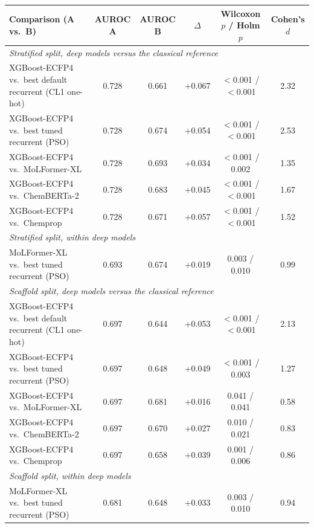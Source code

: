 \begin{tabular}{lccccc}
\toprule
Comparison (A vs.\ B) & AUROC A & AUROC B & $\Delta$ & Wilcoxon $p$ / Holm $p$ & Cohen's $d$ \\
\midrule
\multicolumn{6}{l}{\emph{Stratified split, deep models versus the classical reference}} \\
XGBoost-ECFP4 vs.\ best default recurrent (CL1 one-hot) & 0.728 & 0.661 & +0.067 & $<$0.001 / $<$0.001 & 2.32 \\
XGBoost-ECFP4 vs.\ best tuned recurrent (PSO) & 0.728 & 0.674 & +0.054 & $<$0.001 / $<$0.001 & 2.53 \\
XGBoost-ECFP4 vs.\ MoLFormer-XL & 0.728 & 0.693 & +0.034 & $<$0.001 / 0.002 & 1.35 \\
XGBoost-ECFP4 vs.\ ChemBERTa-2 & 0.728 & 0.683 & +0.045 & $<$0.001 / $<$0.001 & 1.67 \\
XGBoost-ECFP4 vs.\ Chemprop & 0.728 & 0.671 & +0.057 & $<$0.001 / $<$0.001 & 1.52 \\
\multicolumn{6}{l}{\emph{Stratified split, within deep models}} \\
MoLFormer-XL vs.\ best tuned recurrent (PSO) & 0.693 & 0.674 & +0.019 & 0.003 / 0.010 & 0.99 \\
\midrule
\multicolumn{6}{l}{\emph{Scaffold split, deep models versus the classical reference}} \\
XGBoost-ECFP4 vs.\ best default recurrent (CL1 one-hot) & 0.697 & 0.644 & +0.053 & $<$0.001 / $<$0.001 & 2.13 \\
XGBoost-ECFP4 vs.\ best tuned recurrent (PSO) & 0.697 & 0.648 & +0.049 & $<$0.001 / 0.003 & 1.27 \\
XGBoost-ECFP4 vs.\ MoLFormer-XL & 0.697 & 0.681 & +0.016 & 0.041 / 0.041 & 0.58 \\
XGBoost-ECFP4 vs.\ ChemBERTa-2 & 0.697 & 0.670 & +0.027 & 0.010 / 0.021 & 0.83 \\
XGBoost-ECFP4 vs.\ Chemprop & 0.697 & 0.658 & +0.039 & 0.001 / 0.006 & 0.86 \\
\multicolumn{6}{l}{\emph{Scaffold split, within deep models}} \\
MoLFormer-XL vs.\ best tuned recurrent (PSO) & 0.681 & 0.648 & +0.033 & 0.003 / 0.010 & 0.94 \\
\bottomrule
\end{tabular}